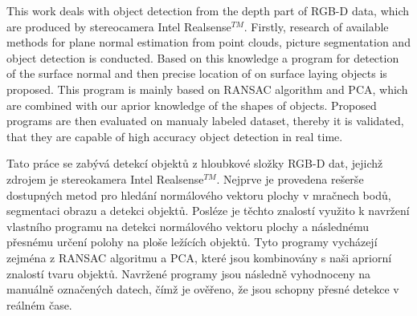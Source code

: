 
\ctuprocess

\begin{abstract-english}
This work deals with object detection from the depth part of RGB-D data, which are produced by stereocamera Intel\textregistered{} Realsense$^{TM}$. Firstly, research of available methods for plane normal estimation from point clouds, picture segmentation and object detection is conducted. Based on this knowledge a program for detection of the surface normal and then precise location of on surface laying objects is proposed. This program is mainly based on RANSAC algorithm and PCA, which are combined with our aprior knowledge of the shapes of objects. Proposed programs are then evaluated on manualy labeled dataset, thereby it is validated, that they are capable of high accuracy object detection in real time.
\end{abstract-english}

\begin{abstract-czech}
Tato práce se zabývá detekcí objektů z hloubkové složky RGB-D dat, jejichž zdrojem je stereokamera Intel\textregistered{} Realsense$^{TM}$. Nejprve je provedena rešerše dostupných metod pro hledání normálového vektoru plochy v mračnech bodů, segmentaci obrazu a detekci objektů. Posléze je těchto znalostí využito k navržení vlastního programu na detekci normálového vektoru plochy a následnému přesnému určení polohy na ploše ležících objektů. Tyto programy vycházejí zejména z RANSAC algoritmu a PCA, které jsou kombinovány s naši apriorní znalostí tvaru objektů. Navržené programy jsou následně vyhodnoceny na manuálně označených datech, čímž je ověřeno, že jsou schopny přesné detekce v reálném čase.
\end{abstract-czech}

